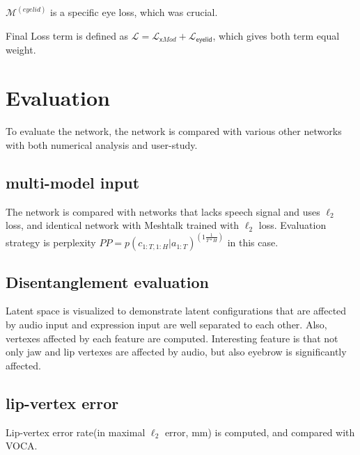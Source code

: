 \documentclass[10pt,twocolumn,letterpaper]{article}
\begin{document}
      \(\mathcal{M}^{(eyelid)}\) is a specific eye loss, which was crucial.
      
      Final Loss term is defined as \(\mathcal{L} =\mathcal{L}_{\mathsf{x}Mod}+\mathcal{L}_{\mathsf{eyelid}} \), which gives both term equal weight.
  \section{Evaluation}
      To evaluate the network, the network is compared with various other networks with both numerical analysis and user-study.
    \subsection{multi-model input}
      The network is compared with  networks that lacks speech signal and uses \(\ell_2\) loss, and identical network with Meshtalk trained with \(\ell_2\) loss.
      Evaluation strategy is perplexity \(PP = p(c_{1:T,1:H}|a_{1:T})^(1\frac{1}{T*H})\) in this case.
    \subsection{Disentanglement evaluation}
      Latent space is visualized to demonstrate latent configurations that are affected by audio input and expression input are well separated to each other.
      Also, vertexes affected by each feature are computed.
      Interesting feature is that not only jaw and lip vertexes are affected by audio, but also eyebrow is significantly affected.
    \subsection{lip-vertex error}
      Lip-vertex error rate(in maximal \(\ell_2\) error, mm) is computed, and compared with VOCA\cite{Cudeiro_2019_CVPR}.
      
\end{document}
